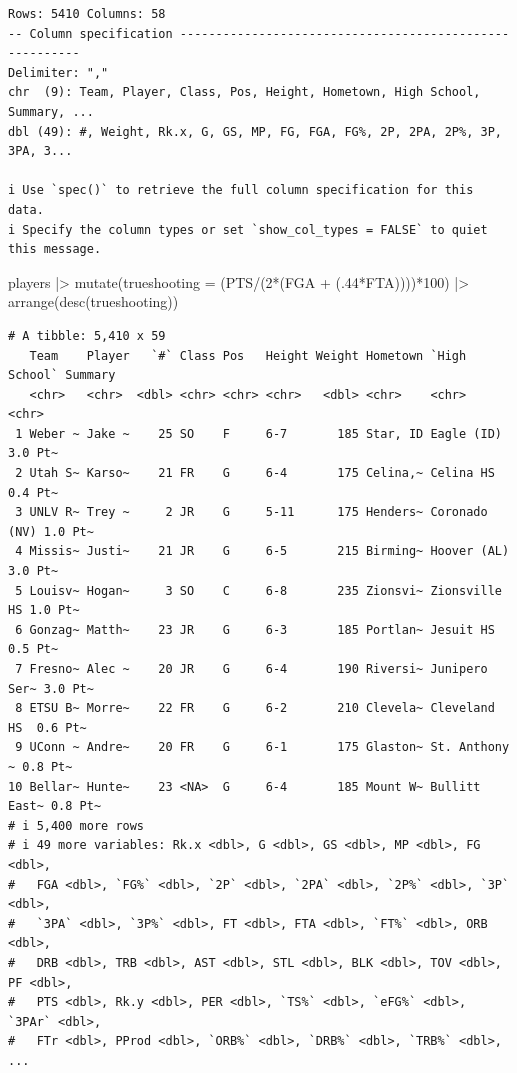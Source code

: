 \documentclass[
  letterpaper,
  DIV=11,
  numbers=noendperiod]{scrreprt}
\newenvironment{Shaded}{\begin{snugshade}}{\end{snugshade}}
\newcommand{\AttributeTok}[1]{\textcolor[rgb]{0.40,0.45,0.13}{#1}}
\newcommand{\DecValTok}[1]{\textcolor[rgb]{0.68,0.00,0.00}{#1}}
\newcommand{\FunctionTok}[1]{\textcolor[rgb]{0.28,0.35,0.67}{#1}}
\newcommand{\NormalTok}[1]{\textcolor[rgb]{0.00,0.23,0.31}{#1}}
\newcommand{\SpecialCharTok}[1]{\textcolor[rgb]{0.37,0.37,0.37}{#1}}
\begin{document}
\begin{verbatim}
Rows: 5410 Columns: 58
-- Column specification --------------------------------------------------------
Delimiter: ","
chr  (9): Team, Player, Class, Pos, Height, Hometown, High School, Summary, ...
dbl (49): #, Weight, Rk.x, G, GS, MP, FG, FGA, FG%, 2P, 2PA, 2P%, 3P, 3PA, 3...

i Use `spec()` to retrieve the full column specification for this data.
i Specify the column types or set `show_col_types = FALSE` to quiet this message.
\end{verbatim}

\begin{Shaded}
\begin{Highlighting}[]
\NormalTok{players }\SpecialCharTok{|\textgreater{}}
  \FunctionTok{mutate}\NormalTok{(}\AttributeTok{trueshooting =}\NormalTok{ (PTS}\SpecialCharTok{/}\NormalTok{(}\DecValTok{2}\SpecialCharTok{*}\NormalTok{(FGA }\SpecialCharTok{+}\NormalTok{ (.}\DecValTok{44}\SpecialCharTok{*}\NormalTok{FTA))))}\SpecialCharTok{*}\DecValTok{100}\NormalTok{) }\SpecialCharTok{|\textgreater{}}
  \FunctionTok{arrange}\NormalTok{(}\FunctionTok{desc}\NormalTok{(trueshooting))}
\end{Highlighting}
\end{Shaded}

\begin{verbatim}
# A tibble: 5,410 x 59
   Team    Player   `#` Class Pos   Height Weight Hometown `High School` Summary
   <chr>   <chr>  <dbl> <chr> <chr> <chr>   <dbl> <chr>    <chr>         <chr>  
 1 Weber ~ Jake ~    25 SO    F     6-7       185 Star, ID Eagle (ID)    3.0 Pt~
 2 Utah S~ Karso~    21 FR    G     6-4       175 Celina,~ Celina HS     0.4 Pt~
 3 UNLV R~ Trey ~     2 JR    G     5-11      175 Henders~ Coronado (NV) 1.0 Pt~
 4 Missis~ Justi~    21 JR    G     6-5       215 Birming~ Hoover (AL)   3.0 Pt~
 5 Louisv~ Hogan~     3 SO    C     6-8       235 Zionsvi~ Zionsville HS 1.0 Pt~
 6 Gonzag~ Matth~    23 JR    G     6-3       185 Portlan~ Jesuit HS     0.5 Pt~
 7 Fresno~ Alec ~    20 JR    G     6-4       190 Riversi~ Junipero Ser~ 3.0 Pt~
 8 ETSU B~ Morre~    22 FR    G     6-2       210 Clevela~ Cleveland HS  0.6 Pt~
 9 UConn ~ Andre~    20 FR    G     6-1       175 Glaston~ St. Anthony ~ 0.8 Pt~
10 Bellar~ Hunte~    23 <NA>  G     6-4       185 Mount W~ Bullitt East~ 0.8 Pt~
# i 5,400 more rows
# i 49 more variables: Rk.x <dbl>, G <dbl>, GS <dbl>, MP <dbl>, FG <dbl>,
#   FGA <dbl>, `FG%` <dbl>, `2P` <dbl>, `2PA` <dbl>, `2P%` <dbl>, `3P` <dbl>,
#   `3PA` <dbl>, `3P%` <dbl>, FT <dbl>, FTA <dbl>, `FT%` <dbl>, ORB <dbl>,
#   DRB <dbl>, TRB <dbl>, AST <dbl>, STL <dbl>, BLK <dbl>, TOV <dbl>, PF <dbl>,
#   PTS <dbl>, Rk.y <dbl>, PER <dbl>, `TS%` <dbl>, `eFG%` <dbl>, `3PAr` <dbl>,
#   FTr <dbl>, PProd <dbl>, `ORB%` <dbl>, `DRB%` <dbl>, `TRB%` <dbl>, ...
\end{verbatim}
\end{document}
